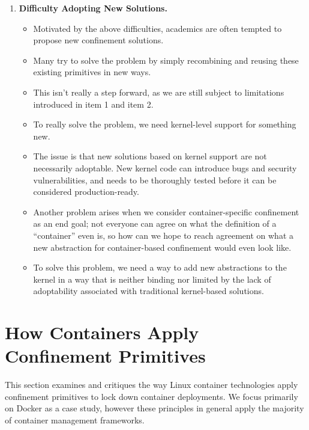 \begin{enumerate}
  \item \textbf{Difficulty Adopting New Solutions.}
  \begin{inprogress}
    \begin{itemize}
      \item Motivated by the above difficulties, academics are often tempted to propose new confinement solutions.
      \item Many try to solve the problem by simply recombining and reusing these existing primitives in new ways.
      \item This isn't really a step forward, as we are still subject to limitations introduced in item 1 and item 2.
      \item To really solve the problem, we need kernel-level support for something new.
      \item The issue is that new solutions based on kernel support are not necessarily
            adoptable. New kernel code can introduce bugs and security vulnerabilities, and
            needs to be thoroughly tested before it can be considered production-ready.
      \item Another problem arises when we consider container-specific confinement as an
            end goal; not everyone can agree on what the definition of a \enquote{container}
            even is, so how can we hope to reach agreement on what a new abstraction for
            container-based confinement would even look like.
      \item To solve this problem, we need a way to add new abstractions to the kernel in
            a way that is neither binding nor limited by the lack of adoptability associated
            with traditional kernel-based solutions.
    \end{itemize}
  \end{inprogress}
\end{enumerate}



\section{How Containers Apply Confinement Primitives}%
\label{s:cp-containers}

This section examines and critiques the way Linux container technologies apply confinement
primitives to lock down container deployments. We focus primarily on Docker as a case
study, however these principles in general apply the majority of container management
frameworks.

